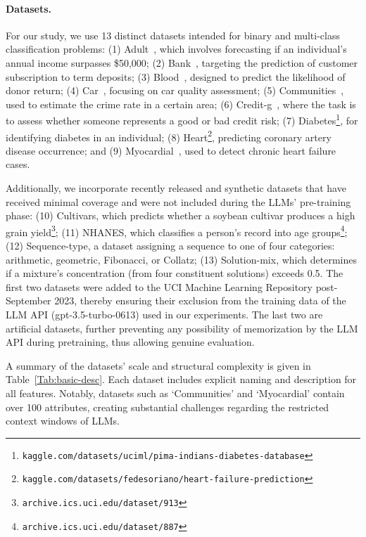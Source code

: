 \paragraph{Datasets.}
For our study, we use 13 distinct datasets intended for binary and multi-class classification problems: (1) Adult~\cite{asuncion2007uci}, which involves forecasting if an individual's annual income surpasses \$50,000; (2) Bank~\cite{moro2014data}, targeting the prediction of customer subscription to term deposits; (3) Blood~\cite{yeh2009knowledge}, designed to predict the likelihood of donor return; (4) Car~\cite{kadra2021well}, focusing on car quality assessment; (5) Communities~\cite{misc_communities_and_crime_183}, used to estimate the crime rate in a certain area; (6) Credit-g~\cite{kadra2021well}, where the task is to assess whether someone represents a good or bad credit risk; (7) Diabetes\footnote{\texttt{kaggle.com/datasets/uciml/pima-indians-diabetes-database}}, for identifying diabetes in an individual; (8) Heart\footnote{\texttt{kaggle.com/datasets/fedesoriano/heart-failure-prediction}}, predicting coronary artery disease occurrence; and (9) Myocardial~\cite{misc_myocardial_infarction_complications_579}, used to detect chronic heart failure cases.

Additionally, we incorporate recently released and synthetic datasets that have received minimal coverage and were not included during the LLMs' pre-training phase: (10) Cultivars, which predicts whether a soybean cultivar produces a high grain yield\footnote{\texttt{archive.ics.uci.edu/dataset/913}}; (11) NHANES, which classifies a person's record into age groups\footnote{\texttt{archive.ics.uci.edu/dataset/887}}; (12) Sequence-type, a dataset assigning a sequence to one of four categories: arithmetic, geometric, Fibonacci, or Collatz; (13) Solution-mix, which determines if a mixture’s concentration (from four constituent solutions) exceeds 0.5. The first two datasets were added to the UCI Machine Learning Repository post-September 2023, thereby ensuring their exclusion from the training data of the LLM API (gpt-3.5-turbo-0613) used in our experiments. The last two are artificial datasets, further preventing any possibility of memorization by the LLM API during pretraining, thus allowing genuine evaluation.

A summary of the datasets' scale and structural complexity is given in Table~\ref{Tab:basic-desc}.
Each dataset includes explicit naming and description for all features. Notably, datasets such as `Communities' and `Myocardial' contain over 100 attributes, creating substantial challenges regarding the restricted context windows of LLMs.


